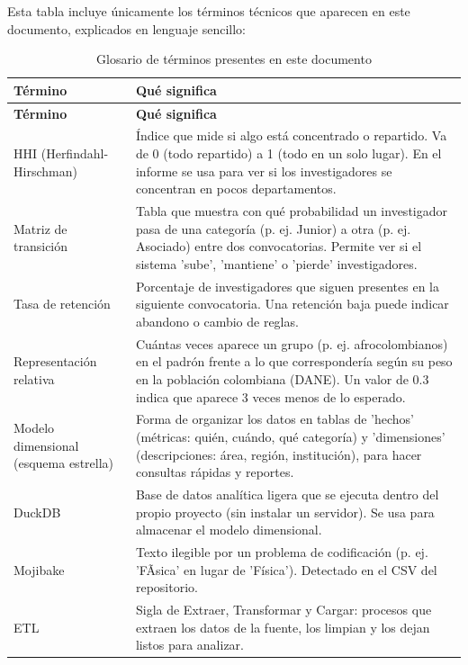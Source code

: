Esta tabla incluye únicamente los términos técnicos que aparecen en este
documento, explicados en lenguaje sencillo:

\begingroup
\small
\setlength{\tabcolsep}{3pt}
\begin{longtable}{>{\raggedright\arraybackslash}p{4.3cm}>{\raggedright\arraybackslash}p{9.8cm}}
\caption{Glosario de términos presentes en este documento}
\label{tab:glosario}\\
\toprule
\textbf{Término} & \textbf{Qué significa} \\
\midrule
\endfirsthead
\toprule
\textbf{Término} & \textbf{Qué significa} \\
\midrule
\endhead
    HHI (Herfindahl-Hirschman) & Índice que mide si algo está concentrado o repartido. Va de 0 (todo repartido) a 1 (todo en un solo lugar). En el informe se usa para ver si los investigadores se concentran en pocos departamentos.
 \\
    Matriz de transición & Tabla que muestra con qué probabilidad un investigador pasa de una categoría (p. ej. Junior) a otra (p. ej. Asociado) entre dos convocatorias. Permite ver si el sistema 'sube', 'mantiene' o 'pierde' investigadores.
 \\
    Tasa de retención & Porcentaje de investigadores que siguen presentes en la siguiente convocatoria. Una retención baja puede indicar abandono o cambio de reglas.
 \\
    Representación relativa & Cuántas veces aparece un grupo (p. ej. afrocolombianos) en el padrón frente a lo que correspondería según su peso en la población colombiana (DANE). Un valor de 0.3 indica que aparece 3 veces menos de lo esperado.
 \\
    Modelo dimensional (esquema estrella) & Forma de organizar los datos en tablas de 'hechos' (métricas: quién, cuándo, qué categoría) y 'dimensiones' (descripciones: área, región, institución), para hacer consultas rápidas y reportes.
 \\
    DuckDB & Base de datos analítica ligera que se ejecuta dentro del propio proyecto (sin instalar un servidor). Se usa para almacenar el modelo dimensional.
 \\
    Mojibake & Texto ilegible por un problema de codificación (p. ej. 'FÃ­sica' en lugar de 'Física'). Detectado en el CSV del repositorio.
 \\
    ETL & Sigla de Extraer, Transformar y Cargar: procesos que extraen los datos de la fuente, los limpian y los dejan listos para analizar.
 \\

\end{longtable}
